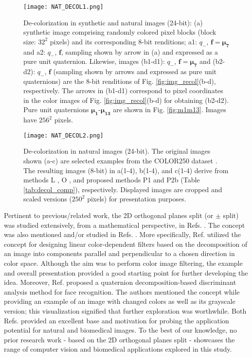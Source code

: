 \documentclass[superscriptaddress,longbibliography,aps,prl,twocolumn,10pt]{revtex4-2}
\begin{document}
\begin{figure}[t]
\centering
\texttt{[image: NAT\_DECOL1.png]}
\vspace{-12pt}
\caption{\footnotesize{De-colorization in synthetic and natural images (24-bit): (a) synthetic image comprising randomly colored pixel blocks (block size: $32^2$ pixels) and its corresponding 8-bit renditions; a1: $q_-$, $\boldsymbol{f} = \boldsymbol{\mu_{7}}$ and a2: $q_-$, $\boldsymbol{f}$, sampling shown by arrow in (a) and expressed as a pure unit quaternion. Likewise, images (b1-d1): $q_-$, $\boldsymbol{f} = \boldsymbol{\mu_{7}}$ and (b2-d2): $q_-$, $\boldsymbol{f}$ (sampling shown by arrows and expressed as pure unit quaternions) are the 8-bit renditions of Fig. \ref{fig:img_recol}(b-d), respectively. The arrows in (b1-d1) correspond to pixel coordinates in the color images of Fig. \ref{fig:img_recol}(b-d) for obtaining (b2-d2). Pure unit quaternions $\boldsymbol{\mu_{1}}$-$\boldsymbol{\mu_{13}}$ are shown in Fig. \ref{fig:m1m13}. Images have $256^2$ pixels.}}
\label{fig:img_decol1}
\end{figure}

\begin{figure}[t]
\centering
\texttt{[image: NAT\_DECOL2.png]}
\vspace{-12pt}
\caption{\footnotesize{De-colorization in natural images (24-bit). The original images shown (a-c) are selected examples from the COLOR250 dataset \cite{Lu2014}. The resulting images (8-bit) in a(1-4), b(1-4), and c(1-4) derive from methods L \cite{Hunt2011}, O \cite{ITU-R_BT.2100}, and proposed methods P1 and P2b (Table \ref{tab:decol_comp}), respectively. Displayed images are cropped and scaled versions ($250^2$ pixels) for presentation purposes.}}
\label{fig:img_decol2}
\end{figure}

Pertinent to previous/related work, the 2D orthogonal planes split (or $\pm$ split) was studied extensively, from a mathematical perspective, in Refs. \cite{HitzerSangwine2013, Hitzer2015}. The concept was also mentioned and/or studied in Refs. \cite{Ell2000, Sangwine2002-pk, Moxey2002, Hitzer2007, Ell2007b, Hitzer2009, Sangwine2013, Lan2016, Hitzer2016, Bahri2019}. More specifically, Ref. \cite{Sangwine2002-pk} utilized the concept for designing linear color-dependent filters based on the decomposition of an image into components parallel and perpendicular to a chosen direction in color space. Although the aim was to perform color image filtering, the example and overall presentation provided a good starting point for further developing the idea. Moreover, Ref. \cite{Lan2016} proposed a quaternion decomposition-based discriminant analysis method for face recognition. The authors mentioned the concept while providing an example of an image with changed colors as well as its grayscale version; this visualization signified that further exploration was worthwhile. Both Refs. \cite{Sangwine2002-pk, Lan2016} provided an excellent base and motivation for probing the application potential for natural and biomedical images. To the best of our knowledge, no prior research work - based on the 2D orthogonal planes split - showcases the range of computer vision and biomedical applications explored in this study.
\end{document}
